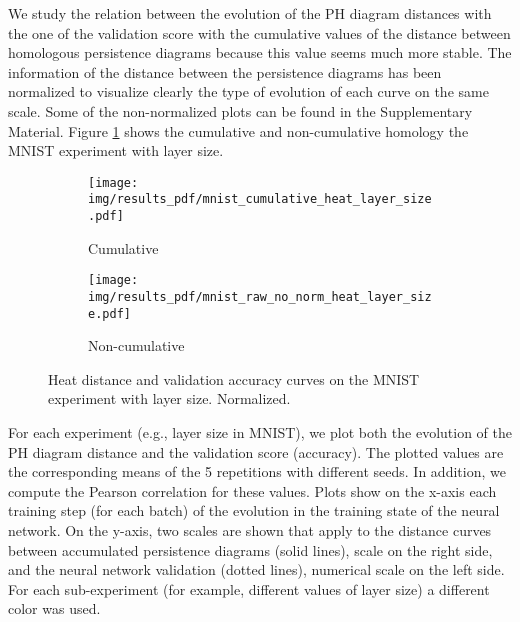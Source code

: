 \documentclass{article}
\begin{document}


We study the relation between the evolution of the PH diagram distances with the one of the validation score with the cumulative values of the distance between homologous persistence diagrams because this value seems much more stable. The information of the distance between the persistence diagrams has been normalized to visualize clearly the type of evolution of each curve on the same scale. Some of the non-normalized plots can be found in the Supplementary Material. Figure \ref{fig:ph_diagrams} shows the cumulative and non-cumulative homology the MNIST experiment with layer size.


\begin{figure}[h]
\centering
\begin{subfigure}{.48\textwidth}
  \centering
  \texttt{[image: img/results\_pdf/mnist\_cumulative\_heat\_layer\_size.pdf]}
  \caption{Cumulative}
\end{subfigure}
\begin{subfigure}{.48\textwidth}
  \centering
  \texttt{[image: img/results\_pdf/mnist\_raw\_no\_norm\_heat\_layer\_size.pdf]}
  \caption{Non-cumulative}
\end{subfigure}
\caption{Heat distance and validation accuracy curves on the MNIST experiment with layer size. Normalized.}
\label{fig:ph_diagrams}
\end{figure}



For each experiment (e.g., layer size in MNIST), we plot both the evolution of the PH diagram distance and the validation score (accuracy). The plotted values are the corresponding means of the 5 repetitions with different seeds. In addition, we compute the Pearson correlation for these values. Plots show on the x-axis each training step (for each batch) of the evolution in the training state of the neural network. On the y-axis, two scales are shown that apply to the distance curves between accumulated persistence diagrams (solid lines), scale on the right side, and the neural network validation (dotted lines), numerical scale on the left side. For each sub-experiment (for example, different values of layer size) a different color was used. %
\end{document}
